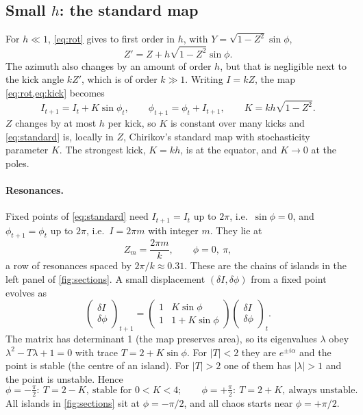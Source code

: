 \documentclass[11pt,a4paper]{article}
\begin{document}
\subsection{Small \texorpdfstring{$h$}{h}: the standard map}\label{sec:standard}

For $h\ll1$, \cref{eq:rot} gives to first order in $h$, with $Y=\sqrt{1-Z^2}\sin\phi$,
\begin{equation}
  Z' = Z + h\sqrt{1-Z^2}\sin\phi .
\end{equation}
The azimuth also changes by an amount of order $h$, but that is negligible next to the kick angle $kZ'$, which is of
order $k\gg1$. Writing $I=kZ$, the map \cref{eq:rot,eq:kick} becomes
\begin{equation}\label{eq:standard}
  I_{t+1} = I_t + K\sin\phi_t,\qquad \phi_{t+1} = \phi_t + I_{t+1},\qquad K = kh\sqrt{1-Z^2}.
\end{equation}
$Z$ changes by at most $h$ per kick, so $K$ is constant over many kicks and \cref{eq:standard} is, locally in $Z$,
Chirikov's standard map with stochasticity parameter $K$. The
strongest kick, $K=kh$, is at the equator, and $K\to0$ at the poles.

\paragraph{Resonances.}
Fixed points of \cref{eq:standard} need $I_{t+1}=I_t$ up to $2\pi$, i.e.\ $\sin\phi=0$, and $\phi_{t+1}=\phi_t$ up to
$2\pi$, i.e.\ $I=2\pi m$ with integer $m$. They lie at
\begin{equation}\label{eq:res}
  Z_m = \frac{2\pi m}{k},\qquad \phi = 0,\ \pi,
\end{equation}
a row of resonances spaced by $2\pi/k\approx0.31$. These are the chains of islands in the left panel of
\cref{fig:sections}. A small displacement $(\delta I,\delta\phi)$ from a fixed point evolves as
\begin{equation}
  \begin{pmatrix}\delta I\\ \delta\phi\end{pmatrix}_{t+1} =
  \begin{pmatrix}1 & K\sin\phi\\ 1 & 1+K\sin\phi\end{pmatrix}
  \begin{pmatrix}\delta I\\ \delta\phi\end{pmatrix}_{t}.
\end{equation}
The matrix has determinant 1 (the map preserves area), so its eigenvalues $\lambda$ obey $\lambda^2-T\lambda+1=0$ with
trace $T = 2+K\sin\phi$. For $|T|<2$ they are $e^{\pm i\alpha}$ and the point is stable (the centre of an island). For
$|T|>2$ one of them has $|\lambda|>1$ and the point is unstable. Hence
\begin{equation}
  \phi=-\tfrac{\pi}{2}:\ T=2-K,\ \text{stable for } 0<K<4;\qquad
  \phi=+\tfrac{\pi}{2}:\ T=2+K,\ \text{always unstable}.
\end{equation}
All islands in \cref{fig:sections} sit at $\phi=-\pi/2$, and all chaos starts near $\phi=+\pi/2$.
\end{document}

